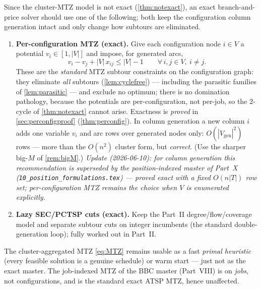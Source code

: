\documentclass[11pt,a4paper]{article}
\theoremstyle{plain}
\theoremstyle{definition}
\begin{document}
Since the cluster-MTZ model is not exact (\cref{thm:notexact}), an exact branch-and-price
solver should use one of the following; both keep the configuration column generation intact
and only change how subtours are eliminated.
\begin{enumerate}[label=(\alph*)]
\item \textbf{Per-configuration MTZ (exact).} Give each configuration node $i\in V$ a
potential $v_i\in[1,|V|]$ and impose, for generated arcs,
\[
  v_i - v_j + |V|\,x_{ij} \le |V|-1 \qquad \forall\, i,j\in V,\ i\ne j .
\]
These are the \emph{standard} MTZ subtour constraints on the configuration graph: they
eliminate \emph{all} subtours (\cref{lem:cyclefree}) --- including the parasitic families of
\cref{lem:parasitic} --- and exclude no optimum; there is no domination pathology, because
the potentials are per-configuration, not per-job, so the $2$-cycle of
\cref{thm:notexact} cannot arise. Exactness is \emph{proved} in
\cref{sec:perconfigproof} (\cref{thm:perconfig}). In column generation a new column $i$ adds
one variable $v_i$ and arc rows over generated nodes only: $O(|V_{\mathrm{gen}}|^{2})$ rows
--- more than the $O(n^{2})$ cluster form, but \emph{correct}. (Use the sharper big-$M$
of \cref{rem:bigM}.)
\emph{Update (2026-06-10): for column generation this recommendation is superseded by
the position-indexed master of Part~X (\texttt{10\_position\_formulations.tex}) ---
proved exact with a \emph{fixed} $O(n|T|)$ row set; per-configuration MTZ remains the
choice when $V$ is enumerated explicitly.}
\item \textbf{Lazy SEC/PCTSP cuts (exact).} Keep the Part~II degree/flow/coverage model and
separate subtour cuts on integer incumbents (the standard double-generation loop); fully
worked out in Part~II.
\end{enumerate}
\noindent The cluster-aggregated MTZ \eqref{eq:MTZ} remains usable as a fast \emph{primal
heuristic} (every feasible solution is a genuine schedule) or warm start --- just not as the
exact master. The job-indexed MTZ of the BBC master (Part~VIII) is on \emph{jobs}, not
configurations, and is the standard exact ATSP MTZ, hence unaffected.
\end{document}
